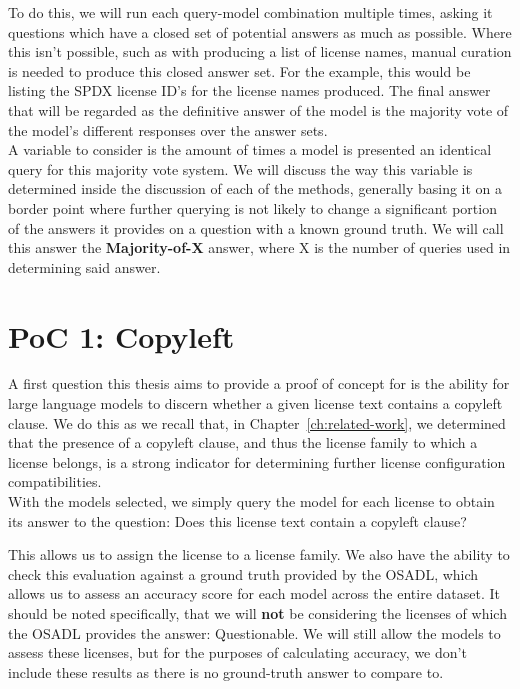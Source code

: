 To do this, we will run each query-model combination multiple times, asking it questions which have a closed set of potential answers as much as possible. Where this isn't possible, such as with producing a list of license names, manual curation is needed to produce this closed answer set. For the example, this would be listing the SPDX license ID's for the license names produced. The final answer that will be regarded as the definitive answer of the model is the majority vote of the model's different responses over the answer sets. \\

A variable to consider is the amount of times a model is presented an identical query for this majority vote system. We will discuss the way this variable is determined inside the discussion of each of the methods, generally basing it on a border point where further querying is not likely to change a significant portion of the answers it provides on a question with a known ground truth. We will call this answer the \textbf{Majority-of-X} answer, where X is the number of queries used in determining said answer.

\section{PoC 1: Copyleft}

A first question this thesis aims to provide a proof of concept for is the ability for large language models to discern whether a given license text contains a copyleft clause. We do this as we recall that, in Chapter~\ref{ch:related-work}, we determined that the presence of a copyleft clause, and thus the license family to which a license belongs, is a strong indicator for determining further license configuration compatibilities. \\

With the models selected, we simply query the model for each license to obtain its answer to the question: Does this license text contain a copyleft clause?

This allows us to assign the license to a license family. We also have the ability to check this evaluation against a ground truth provided by the OSADL, which allows us to assess an accuracy score for each model across the entire dataset. It should be noted specifically, that we will \textbf{not} be considering the licenses of which the OSADL provides the answer: Questionable. We will still allow the models to assess these licenses, but for the purposes of calculating accuracy, we don't include these results as there is no ground-truth answer to compare to.\\

